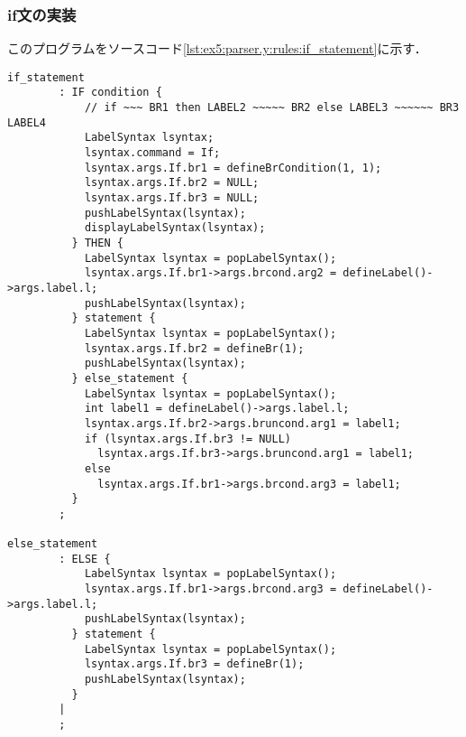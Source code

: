 \documentclass[uplatex]{jsarticle}
\begin{document}
\subsubsection{if文の実装}
このプログラムをソースコード\ref{lst:ex5:parser.y:rules:if_statement}に示す．
\begin{lstlisting}[caption=if文の処理,label=lst:ex5:parser.y:rules:if_statement]
if_statement
        : IF condition {
            // if ~~~ BR1 then LABEL2 ~~~~~ BR2 else LABEL3 ~~~~~~ BR3 LABEL4
            LabelSyntax lsyntax;
            lsyntax.command = If;
            lsyntax.args.If.br1 = defineBrCondition(1, 1);
            lsyntax.args.If.br2 = NULL;
            lsyntax.args.If.br3 = NULL;
            pushLabelSyntax(lsyntax);
            displayLabelSyntax(lsyntax);
          } THEN {
            LabelSyntax lsyntax = popLabelSyntax();
            lsyntax.args.If.br1->args.brcond.arg2 = defineLabel()->args.label.l;
            pushLabelSyntax(lsyntax);
          } statement {
            LabelSyntax lsyntax = popLabelSyntax();
            lsyntax.args.If.br2 = defineBr(1);
            pushLabelSyntax(lsyntax);
          } else_statement {
            LabelSyntax lsyntax = popLabelSyntax();
            int label1 = defineLabel()->args.label.l;
            lsyntax.args.If.br2->args.bruncond.arg1 = label1;
            if (lsyntax.args.If.br3 != NULL)
              lsyntax.args.If.br3->args.bruncond.arg1 = label1;
            else
              lsyntax.args.If.br1->args.brcond.arg3 = label1;
          }
        ;

else_statement
        : ELSE {
            LabelSyntax lsyntax = popLabelSyntax();
            lsyntax.args.If.br1->args.brcond.arg3 = defineLabel()->args.label.l;
            pushLabelSyntax(lsyntax);
          } statement {
            LabelSyntax lsyntax = popLabelSyntax();
            lsyntax.args.If.br3 = defineBr(1);
            pushLabelSyntax(lsyntax);
          }
        |
        ;
\end{lstlisting}
\end{document}
